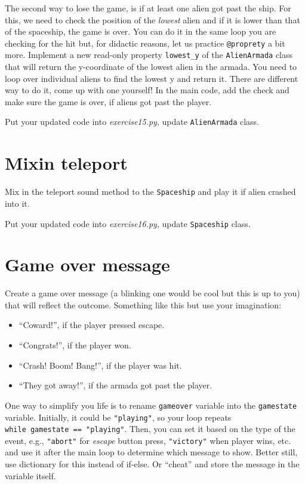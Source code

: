 \documentclass[
]{book}
\providecommand{\tightlist}{%
  \setlength{\itemsep}{0pt}\setlength{\parskip}{0pt}}
\begin{document}
The second way to lose the game, is if at least one alien got past the ship. For this, we need to check the position of the \emph{lowest} alien and if it is lower than that of the spaceship, the game is over. You can do it in the same loop you are checking for the hit but, for didactic reasons, let us practice \texttt{@proprety} a bit more. Implement a new read-only property \texttt{lowest\_y} of the \texttt{AlienArmada} class that will return the y-coordinate of the lowest alien in the armada. You need to loop over individual aliens to find the lowest y and return it. There are different way to do it, come up with one yourself! In the main code, add the check and make sure the game is over, if aliens got past the player.

Put your updated code into \emph{exercise15.py}, update \texttt{AlienArmada} class.

\hypertarget{mixin-teleport}{%
\section{Mixin teleport}\label{mixin-teleport}}

Mix in the teleport sound method to the \texttt{Spaceship} and play it if alien crashed into it.

Put your updated code into \emph{exercise16.py}, update \texttt{Spaceship} class.

\hypertarget{game-over-message-1}{%
\section{Game over message}\label{game-over-message-1}}

Create a game over message (a blinking one would be cool but this is up to you) that will reflect the outcome. Something like this but use your imagination:

\begin{itemize}
\tightlist
\item
  ``Coward!'', if the player pressed escape.
\item
  ``Congrats!'', if the player won.
\item
  ``Crash! Boom! Bang!'', if the player was hit.
\item
  ``They got away!'', if the armada got past the player.
\end{itemize}

One way to simplify you life is to rename \texttt{gameover} variable into the \texttt{gamestate} variable. Initially, it could be \texttt{"playing"}, so your loop repeats \texttt{while\ gamestate\ ==\ "playing"}. Then, you can set it based on the type of the event, e.g., \texttt{"abort"} for \emph{escape} button press, \texttt{"victory"} when player wins, etc. and use it after the main loop to determine which message to show. Better still, use dictionary for this instead of if-else. Or ``cheat'' and store the message in the variable itself.
\end{document}
